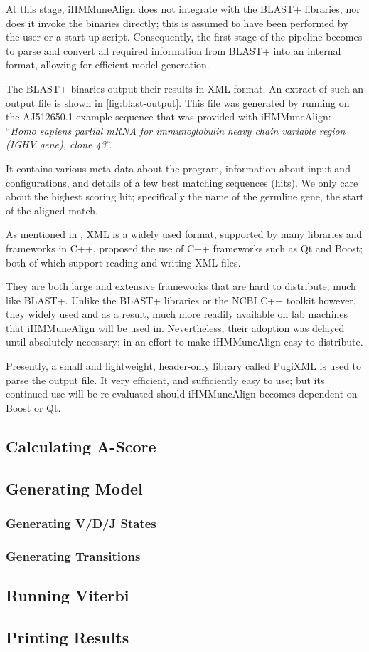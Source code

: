 At this stage, iHMMuneAlign does not integrate with the BLAST+ libraries, nor does it invoke the binaries directly; this is assumed to have been performed by the user or a start-up script. Consequently, the first stage of the pipeline becomes to parse and convert all required information from BLAST+ into an internal format, allowing for efficient model generation.

The BLAST+ binaries output their results in XML format. An extract of such an output file is shown in \autoref{fig:blast-output}. This file was generated by running  on the AJ512650.1 example sequence that was provided with iHMMuneAlign: ``\emph{Homo sapiens partial mRNA for immunoglobulin heavy chain variable region (IGHV gene), clone 43}''.

It contains various meta-data about the program, information about input and configurations, and details of a few best matching sequences (hits). We only care about the highest scoring hit; specifically the name of the germline gene, the start of the aligned match.

As mentioned in , XML is a widely used format, supported by many libraries and frameworks in C++. 
 proposed the use of C++ frameworks such as Qt\autocite{qt} and Boost\autocite{boost}; both of which support reading and writing XML files. 

They are both large and extensive frameworks that are hard to distribute, much like BLAST+. Unlike the BLAST+ libraries or the NCBI C++ toolkit however, they widely used and as a result, much more readily available on lab machines that iHMMuneAlign will be used in. Nevertheless, their adoption was delayed until absolutely necessary; in an effort to make iHMMuneAlign easy to distribute.

Presently, a small and lightweight, header-only library called PugiXML\cite{pugixml} is used to parse the  output file. It very efficient, and sufficiently easy to use; but its continued use will be re-evaluated should iHMMuneAlign becomes dependent on Boost or Qt.

\subsection{Calculating A-Score}


\subsection{Generating Model}
\subsubsection{Generating V/D/J States}
\subsubsection{Generating Transitions}
\subsection{Running Viterbi}
\subsection{Printing Results}



